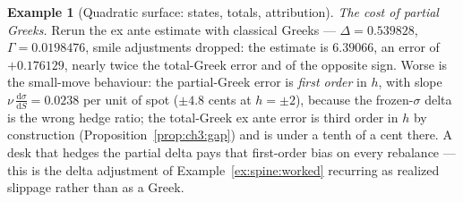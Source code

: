 \documentclass[11pt]{book}
\theoremstyle{plain}
\theoremstyle{definition}
\newtheorem{example}[theorem]{Example}
\theoremstyle{remark}
\newcommand{\vega}{\nu}                          %
\newcommand{\dd}{\mathrm{d}}                                  %
\newcommand{\td}[2]{\frac{\dd #1}{\dd #2}}                    %
\begin{document}
\begin{example}[Quadratic surface: states, totals, attribution]
\emph{The cost of partial Greeks.} Rerun the ex ante estimate with classical
Greeks --- $\Delta = 0.539828$, $\Gamma = 0.0198476$, smile adjustments
dropped: the estimate is $6.39066$, an error of $+0.176129$, nearly twice the
total-Greek error and of the opposite sign. Worse is the small-move
behaviour: the partial-Greek error is \emph{first order} in $h$, with slope
$\vega\,\td{\sigma}{S} = 0.0238$ per unit of spot ($\pm4.8$ cents at
$h = \pm2$), because the frozen-$\sigma$ delta is the wrong hedge
ratio; the total-Greek ex ante error is third order in $h$ by construction
(Proposition~\ref{prop:ch3:gap}) and is under a tenth of a cent there. A
desk that hedges the partial delta pays that first-order bias on every
rebalance --- this is the delta adjustment of
Example~\ref{ex:spine:worked} recurring as realized slippage rather than as
a Greek.
\end{example}
\end{document}
